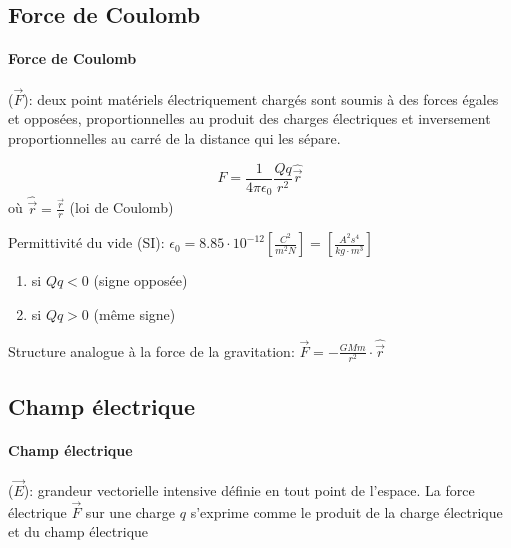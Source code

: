 \documentclass[
    11pt,
    a4paper,
    oneside,
    headinlcude, footinclude,
    twoside,
]{report}
\renewcommand{\vec}[1]{\overrightarrow{#1}}
\begin{document}
\subsection{Force de Coulomb}
\label{sub:force_de_coulomb}

\paragraph{Force de Coulomb}
($\vec F$): deux point matériels électriquement chargés sont soumis à des
forces égales et opposées, proportionnelles au produit des charges électriques
et inversement proportionnelles au carré de la distance qui les sépare.


\begin{equation}
    \label{eq:7.1}
    F = \frac{1}{4 \pi \epsilon_0} \frac{Qq}{r^2} \widehat{\vec r}
\end{equation}
où $\widehat{\vec r} = \frac{\vec r}{r} $ (loi de Coulomb)

Permittivité du vide (SI): $\epsilon_0 = 8.85 \cdot 10^{-12} \left[ \frac{C^2}{m^2N}
\right] = \left[\frac{A^2 s^4}{kg \cdot m^3}\right]$

\begin{center}
    \begin{minipage}{.5\linewidth}
    \end{minipage}
    \begin{minipage}{.49\linewidth}
        \setlength{\parskip}{.3em}
        \begin{enumerate}
            \item si $Qq <0$ (signe opposée)
                \vspace{1cm}
            \item si $Qq >0$ (même signe)
        \end{enumerate}
    \end{minipage}
\end{center}

Structure analogue à la force de la gravitation: $\vec F = - \frac{GMm}{r^2}
\cdot \widehat{\vec r}$

\subsection{Champ électrique}
\label{sub:champ_electrique}

\paragraph{Champ électrique} ($\vec E$): grandeur vectorielle intensive définie
en tout point de l'espace. La force électrique $\vec F$ sur une charge $q$
s'exprime comme le produit de la charge électrique et du champ électrique 
\end{document}

